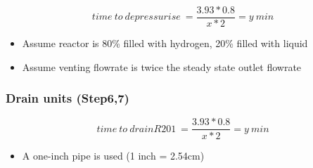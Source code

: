     \begin{equation}
        time\:to\:depressurise\:=\frac{3.93 * 0.8}{x * 2}=y\:min
    \end{equation}
    
    \begin{itemize}
        \item Assume reactor is 80\% filled with hydrogen, 20\% filled with liquid
        \item Assume venting flowrate is twice the steady state outlet flowrate
    \end{itemize}
    
 \subsubsection{Drain units (Step6,7)}   

    \begin{equation}
        time\:to\:drain R201\:=\frac{3.93 * 0.8}{x * 2}=y\:min
    \end{equation}
    
    \begin{itemize}
        \item A one-inch pipe is used (1 inch = 2.54cm)
    \end{itemize}